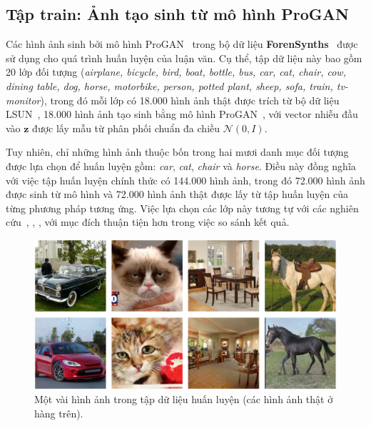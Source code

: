 \subsection{Tập \gls{train}: Ảnh tạo sinh từ mô hình ProGAN}
\label{ssec:tap_du_lieu_progan}
%
Các hình ảnh sinh bởi mô hình ProGAN~\cite{karras2018progressive} trong bộ dữ liệu \textbf{ForenSynths}~\cite{Wang2019CNNGeneratedIA} được sử dụng cho quá trình huấn luyện của luận văn. 
%
Cụ thể, tập dữ liệu này bao gồm 20 lớp đối tượng (\textit{airplane, bicycle, bird, boat, bottle, bus, car, cat, chair, cow, dining table, dog, horse, motorbike, person, potted plant, sheep, sofa, train, tv-monitor}), trong đó mỗi lớp có 18.000 hình ảnh thật được trích từ bộ dữ liệu LSUN~\cite{Yu2015LSUNCO}, 18.000 hình ảnh tạo sinh bằng mô hình ProGAN~\cite{karras2018progressive}, với vector nhiễu đầu vào \( \mathbf{z} \) được lấy mẫu từ phân phối chuẩn đa chiều \( \mathcal{N}(0, I) \).
%
%

Tuy nhiên, chỉ những hình ảnh thuộc bốn trong hai mươi danh mục đối tượng được lựa chọn để huấn luyện gồm: \textit{car}, \textit{cat}, \textit{chair} và \textit{horse}.
%
Điều này đồng nghĩa với việc tập huấn luyện chính thức có 144.000 hình ảnh, trong đó 72.000 hình ảnh được sinh từ mô hình và 72.000 hình ảnh thật được lấy từ tập huấn luyện của từng phương pháp tương ứng.
%
Việc lựa chọn các lớp này tương tự với các nghiên cứu~\cite{Tan2023RethinkingTU}, \cite{Jeong2022FrePGANRD}, \cite{Jeong2021BiHPFBH}, với mục đích thuận tiện hơn trong việc so sánh kết quả.
%
%
\begin{figure}[ht!]
	\centering
	\includegraphics[width=1.0\linewidth]{Images/dataset_progan_samples.png}
	\begin{minipage}{1.0\linewidth}
		\vspace{5mm}
		\caption{Một vài hình ảnh trong tập dữ liệu huấn luyện (các hình ảnh thật ở hàng trên).}
		\label{fig:dataset_progan_samples}
	\end{minipage}
\end{figure}
%
